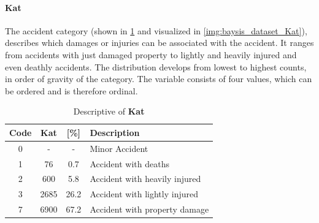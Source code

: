 \paragraph{Kat}
\label{baysis_dataset_Kat}
The accident category (shown in \cref{tbl:baysis_dataset_Kat} and visualized in \cref{img:baysis_dataset_Kat}), describes which damages or injuries can be associated with the accident. It ranges from accidents with just damaged property to lightly and heavily injured and even deathly accidents. The distribution develops from lowest to highest counts, in order of gravity of the category. The variable consists of four values, which can be ordered and is therefore ordinal.
\begin{table}[ht!]
	\centering
	\small
	\begin{tabular}{c|c|c|l} 
		\toprule
		Code & \textbf{Kat} & [\%] & Description \\ 
		\midrule
 		0 	& - 	& 	-	& Minor Accident  \\
 		1 	& 76 	& 0.7 	& Accident with deaths  \\ 
 		2 	& 600	& 5.8	& Accident with heavily injured  \\
 		3 	& 2685	& 26.2	& Accident with lightly injured  \\
		7 	& 6900	& 67.2	& Accident with property damage  \\
		\bottomrule
	\end{tabular}
	\caption{Descriptive of \textbf{Kat}}
	\label{tbl:baysis_dataset_Kat}
\end{table}
